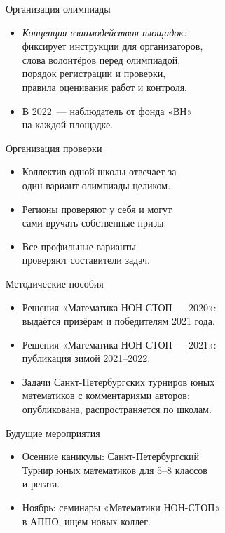 \documentclass[17pt]{extarticle}
\newcommand{\newslide}[1]{\newpage \begin{center} \large #1 \end{center}}
\begin{document}
\newslide{Организация олимпиады}

\begin{itemize}
	\item {\it Концепция взаимодействия площадок:}\\
	фиксирует инструкции для организаторов,\\
	слова волонтёров перед олимпиадой,\\
	порядок регистрации и проверки,\\
	правила оценивания работ и контроля.
	\item В 2022~— наблюдатель от фонда «ВН»\\
	на каждой площадке.
\end{itemize}

\newslide{Организация проверки}

\begin{itemize}
	\item Коллектив одной школы отвечает за\\
	один вариант олимпиады целиком.
	\item Регионы проверяют у себя и могут\\
	сами вручать собственные призы.
	\item Все профильные варианты\\
	проверяют составители задач.
\end{itemize}





\newslide{Методические пособия}

\begin{itemize}
	\item Решения «Математика НОН-СТОП — 2020»:\\ выдаётся призёрам и победителям 2021 года.
	\item Решения «Математика НОН-СТОП — 2021»:\\ публикация зимой 2021–2022.
	\item Задачи Санкт-Петербургских турниров юных\\
	математиков с комментариями авторов:\\
	опубликована, распространяется по школам.
\end{itemize}

\newslide{Будущие мероприятия}

\begin{itemize}
	\item Осенние каникулы: Санкт-Петербургский\\
	Турнир юных математиков для 5–8 классов\\
	и регата.
	\item Ноябрь: семинары «Математики НОН-СТОП»\\
	в АППО, ищем новых коллег.
\end{itemize}
\end{document}
